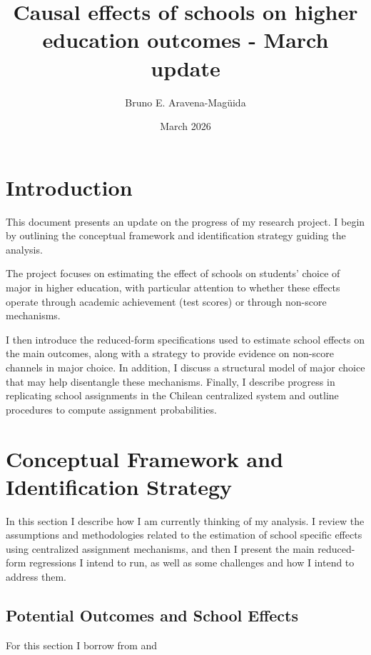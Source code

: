 \documentclass[a4paper, article, english, oneside, unknownkeysallowed, 12pt]{memoir}
\title{Causal effects of schools on higher education outcomes - March update}
\author{ Bruno E. Aravena-Magüida}
\date{March 2026}
\begin{document}
\maketitle

\setcounter{tocdepth}{2}
\renewcommand\contentsname{}

\section{Introduction}

This document presents an update on the progress of my research project. I begin by outlining the conceptual framework and identification strategy guiding the analysis.

The project focuses on estimating the effect of schools on students’ choice of major in higher education, with particular attention to whether these effects operate through academic achievement (test scores) or through non-score mechanisms.

I then introduce the reduced-form specifications used to estimate school effects on the main outcomes, along with a strategy to provide evidence on non-score channels in major choice.
In addition, I discuss a structural model of major choice that may help disentangle these mechanisms. Finally, I describe progress in replicating school assignments in the Chilean centralized system and outline procedures to compute assignment probabilities.

\section{Conceptual Framework and Identification Strategy} \label{framework}

In this section I describe how I am currently thinking of my analysis. I review the assumptions and methodologies related to the estimation of school specific effects using centralized assignment mechanisms, and then I present the main reduced-form regressions I intend to run, as well as some challenges and how I intend to address them.

\subsection{Potential Outcomes and School Effects}

For this section I borrow from \textcite{angrist_credible_2024} and \textcite{abdulkadiroglu_research_2017}
\end{document}
